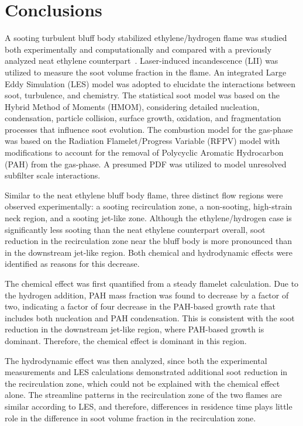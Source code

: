 \documentclass[review,3p,times]{elsarticle}
\begin{document}

\section{Conclusions}

A sooting turbulent bluff body stabilized ethylene/hydrogen flame was studied both experimentally and computationally and compared with a previously analyzed neat ethylene counterpart~\cite{mueller13}.  Laser-induced incandescence (LII) was utilized to measure the soot volume fraction in the flame.  An integrated Large Eddy Simulation (LES) model was adopted to elucidate the interactions between soot, turbulence, and chemistry.  The statistical soot model was based on the Hybrid Method of Moments (HMOM), considering detailed nucleation, condensation, particle collision, surface growth, oxidation, and fragmentation processes that influence soot evolution.  The combustion model for the gas-phase was based on the Radiation Flamelet/Progress Variable (RFPV) model with modifications to account for the removal of Polycyclic Aromatic Hydrocarbon (PAH) from the gas-phase.  A presumed PDF was utilized to model unresolved subfilter scale interactions.

Similar to the neat ethylene bluff body flame, three distinct flow regions were observed experimentally: a sooting recirculation zone, a non-sooting, high-strain neck region, and a sooting jet-like zone.  Although the ethylene/hydrogen case is significantly less sooting than the neat ethylene counterpart overall, soot reduction in the recirculation zone near the bluff body is more pronounced than in the downstream jet-like region.  Both chemical and hydrodynamic effects were identified as reasons for this decrease.

The chemical effect was first quantified from a steady flamelet calculation.  Due to the hydrogen addition, PAH mass fraction was found to decrease by a factor of two, indicating a factor of four decrease in the PAH-based growth rate that includes both nucleation and PAH condensation.  This is consistent with the soot reduction in the downstream jet-like region, where PAH-based growth is dominant.  Therefore, the chemical effect is dominant in this region.

The hydrodynamic effect was then analyzed, since both the experimental measurements and LES calculations demonstrated additional soot reduction in the recirculation zone, which could not be explained with the chemical effect alone.  The streamline patterns in the recirculation zone of the two flames are similar according to LES, and therefore, differences in residence time plays little role in the difference in soot volume fraction in the recirculation zone.  
\end{document}

